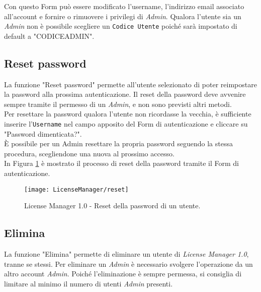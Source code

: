 Con questo Form può essere modificato l’username, l'indirizzo email associato all’account e fornire o rimuovere i privilegi di \textit{Admin}. Qualora l’utente sia un \textit{Admin} non è possibile scegliere un \texttt{Codice Utente} poiché sarà impostato di default a "CODICEADMIN".

\subsection{Reset password}

La funzione "Reset password" permette all’utente selezionato di poter reimpostare la password alla prossima autenticazione. Il reset della password deve avvenire sempre tramite il permesso di un \textit{Admin}, e non sono previsti altri metodi.
\\
Per resettare la password qualora l’utente non ricordasse la vecchia, è sufficiente inserire l’\texttt{Username} nel campo apposito del Form di autenticazione e cliccare su "Password dimenticata?".\\
È possibile per un Admin resettare la propria password seguendo la stessa procedura, scegliendone una nuova al prossimo accesso.
\\
In Figura \ref{reset} è mostrato il processo di reset della password tramite il Form di autenticazione.

\begin{figure}[!h] 
    \centering 
    \texttt{[image: LicenseManager/reset]} 
    \caption{License Manager 1.0 - Reset della password di un utente.}
\label{reset}

\end{figure}


\newpage
\subsection{Elimina}

La funzione "Elimina" permette di eliminare un utente di \textit{License Manager 1.0}, tranne se stessi. Per eliminare un \textit{Admin} è necessario svolgere l’operazione da un altro account \textit{Admin}. Poiché l’eliminazione è sempre permessa, si consiglia di limitare al minimo il numero di utenti \textit{Admin} presenti.
